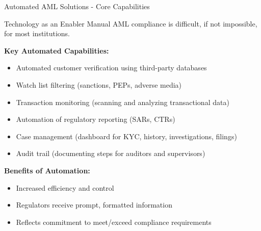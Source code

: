\documentclass[11pt,a4paper]{beamer}
\begin{document}
	\begin{frame}{Automated AML Solutions - Core Capabilities}
		\begin{block}{Technology as an Enabler}
			Manual AML compliance is difficult, if not impossible, for most institutions.
		\end{block}
		\textbf{Key Automated Capabilities:}
		\begin{itemize}
			\item Automated customer verification using third-party databases
			\item Watch list filtering (sanctions, PEPs, adverse media)
			\item Transaction monitoring (scanning and analyzing transactional data)
			\item Automation of regulatory reporting (SARs, CTRs)
			\item Case management (dashboard for KYC, history, investigations, filings)
			\item Audit trail (documenting steps for auditors and supervisors)
		\end{itemize}
		\textbf{Benefits of Automation:}
		\begin{itemize}
			\item Increased efficiency and control
			\item Regulators receive prompt, formatted information
			\item Reflects commitment to meet/exceed compliance requirements
		\end{itemize}
	\end{frame}
	
\end{document}
